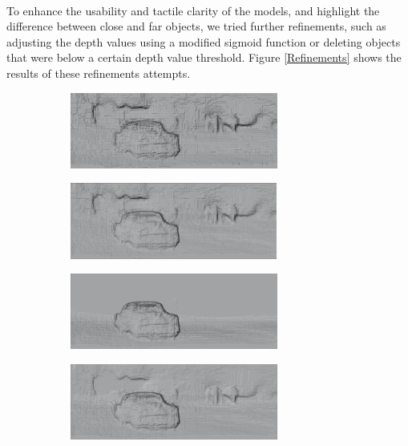 \documentclass[12pt, letterpaper]{article}
\begin{document}
\begin{spacing}{1.15}
\vspace{3cm}
\paragraph{}
To enhance the usability and tactile clarity of the models, and highlight the difference between close and far objects, we tried further refinements, such as adjusting the depth values
using a modified sigmoid function or deleting objects that were below a certain depth value threshold. Figure \ref{Refinements} shows the results of these refinements attempts.

\begin{figure}[!ht]
    \begin{center}
        \begin{subfigure}[b]{0.45\textwidth}
            \includegraphics[height = 2.49cm]{3d_bw_depth}
            \caption{}
        \end{subfigure}
        \begin{subfigure}[b]{0.45\textwidth}
            \includegraphics[height = 2.5cm]{3d_bw_depth_emph}
            \caption{}
        \end{subfigure}
        \begin{subfigure}[b]{0.45\textwidth}
            \includegraphics[height = 2.49cm]{low_rm}
            \caption{}
        \end{subfigure}
        \begin{subfigure}[b]{0.45\textwidth}
            \includegraphics[height = 2.49cm]{low_rm2}
            \caption{}
        \end{subfigure}



\end{center}
\end{figure}
\end{spacing}
\end{document}
